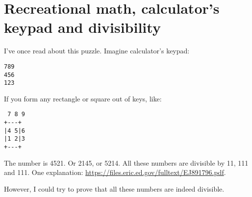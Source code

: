 \section{Recreational math, calculator's keypad and divisibility}

I've once read about this puzzle.
Imagine calculator's keypad:

\begin{lstlisting}
789
456
123
\end{lstlisting}

If you form any rectangle or square out of keys, like:

\begin{lstlisting}
 7 8 9
+---+
|4 5|6
|1 2|3
+---+
\end{lstlisting}

The number is 4521. Or 2145, or 5214.
All these numbers are divisible by 11, 111 and 111.
One explanation: \url{https://files.eric.ed.gov/fulltext/EJ891796.pdf}.

However, I could try to prove that all these numbers are indeed divisible.

